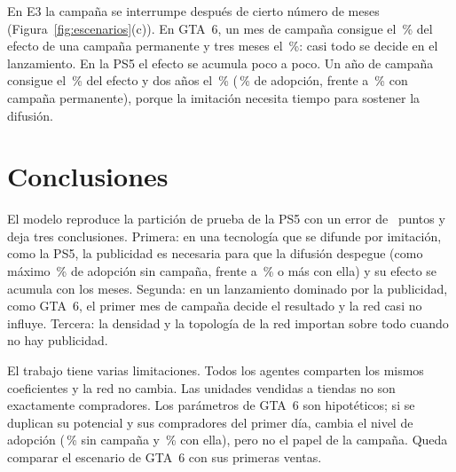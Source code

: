 \documentclass{llncs}
\begin{document}
En E3 la campaña se interrumpe después de cierto número de meses (Figura~\ref{fig:escenarios}(c)). En GTA~6, un mes de campaña consigue el \cifraFraccionGtaDUno\,\% del efecto de una campaña permanente y tres meses el \cifraFraccionGtaDTres\,\%: casi todo se decide en el lanzamiento. En la PS5 el efecto se acumula poco a poco. Un año de campaña consigue el \cifraFraccionPsDDoce\,\% del efecto y dos años el \cifraFraccionPsDVeinticuatro\,\% (\cifraDurPsDVeinticuatro\,\% de adopción, frente a \cifraDurPsDPermanente\,\% con campaña permanente), porque la imitación necesita tiempo para sostener la difusión.

\section{Conclusiones}
\label{sec:conclusiones}

El modelo reproduce la partición de prueba de la PS5 con un error de \cifraAbmRmsePru\ puntos y deja tres conclusiones. Primera: en una tecnología que se difunde por imitación, como la PS5, la publicidad es necesaria para que la difusión despegue (como máximo \cifraPsSinMaxGlobal\,\% de adopción sin campaña, frente a \cifraPsConMin\,\% o más con ella) y su efecto se acumula con los meses. Segunda: en un lanzamiento dominado por la publicidad, como GTA~6, el primer mes de campaña decide el resultado y la red casi no influye. Tercera: la densidad y la topología de la red importan sobre todo cuando no hay publicidad.

El trabajo tiene varias limitaciones. Todos los agentes comparten los mismos coeficientes y la red no cambia. Las unidades vendidas a tiendas no son exactamente compradores. Los parámetros de GTA~6 son hipotéticos; si se duplican su potencial y sus compradores del primer día, cambia el nivel de adopción (\cifraSensDobleSin\,\% sin campaña y \cifraSensDobleCon\,\% con ella), pero no el papel de la campaña. Queda comparar el escenario de GTA~6 con sus primeras ventas.



\end{document}
